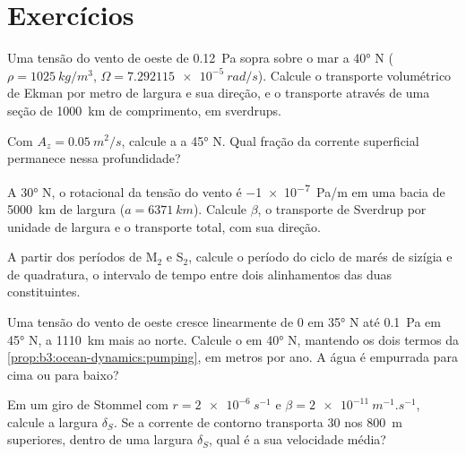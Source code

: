 \section{Exercícios}

\begin{exercise}[$\star$]\label{exo:b3:ocean-dynamics:1}
Uma tensão do vento de oeste de \qty{0.12}{Pa} sopra sobre o mar a \ang{40} N
($\rho = \qty{1025}{kg/m^3}$, $\Omega = \qty{7.292115e-5}{rad/s}$).
Calcule o transporte volumétrico de Ekman por metro de largura e sua direção,
e o transporte através de uma seção de \qty{1000}{km} de comprimento, em sverdrups.
\end{exercise}

\begin{exercise}[$\star$]\label{exo:b3:ocean-dynamics:2}
Com $A_z = \qty{0.05}{m^2/s}$, calcule a  a \ang{45} N. Qual
fração da corrente superficial permanece nessa profundidade?
\end{exercise}

\begin{exercise}[$\star$]\label{exo:b3:ocean-dynamics:3}
A \ang{30} N, o rotacional da tensão do vento é \qty{-1e-7}{Pa/m} em uma
bacia de \qty{5000}{km} de largura ($a = \qty{6371}{km}$). Calcule $\beta$, o
transporte de Sverdrup por unidade de largura e o transporte total, com sua
direção.
\end{exercise}

\begin{exercise}[$\star$]\label{exo:b3:ocean-dynamics:4}
A partir dos períodos de M$_2$ e S$_2$, calcule o período do ciclo de
marés de sizígia e de quadratura, o intervalo de tempo entre dois alinhamentos das duas
constituintes.
\end{exercise}

\begin{exercise}[$\star\star$]\label{exo:b3:ocean-dynamics:5}
Uma tensão do vento de oeste cresce linearmente de 0 em \ang{35} N até \qty{0.1}{Pa} em
\ang{45} N, a \qty{1110}{km} mais ao norte. Calcule o  em
\ang{40} N, mantendo os dois termos da \cref{prop:b3:ocean-dynamics:pumping}, em
metros por ano. A água é empurrada para cima ou para baixo?
\end{exercise}

\begin{exercise}[$\star\star$]\label{exo:b3:ocean-dynamics:6}
Em um giro de Stommel com $r = \qty{2e-6}{s^{-1}}$ e $\beta =
\qty{2e-11}{m^{-1}.s^{-1}}$, calcule a largura $\delta_S$. Se a
corrente de contorno transporta \qty{30}{\sverdrup} nos \qty{800}{m} superiores, dentro de uma
largura $\delta_S$, qual é a sua velocidade média?
\end{exercise}

